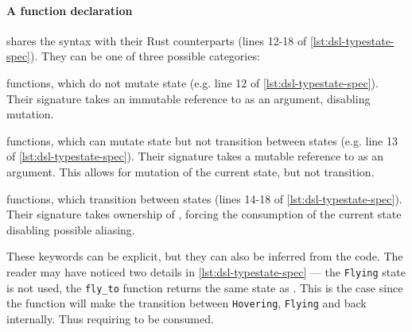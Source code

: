 \paragraph{A function declaration} shares the syntax with their Rust counterparts (lines 12-18 of \autoref{lst:dsl-typestate-spec}).
They can be one of three possible categories:
\begin{compactitem}
    \item {} functions, which do not mutate state (e.g. line 12 of \autoref{lst:dsl-typestate-spec}).
    Their signature takes an immutable reference to  as an argument,
    disabling mutation.
    \item {} functions, which can mutate state but not transition between states (e.g. line 13 of \autoref{lst:dsl-typestate-spec}).
    Their signature takes a mutable reference to  as an argument.
    This allows for mutation of the current state, but not transition.
    \item {} functions, which transition between states (lines 14-18 of \autoref{lst:dsl-typestate-spec}).
    Their signature takes ownership of ,
    forcing the consumption of the current state disabling possible aliasing.
\end{compactitem}
These keywords can be explicit, but they can also be inferred from the code.
The reader may have noticed two details in \autoref{lst:dsl-typestate-spec} ---
the \texttt{Flying} state is not used,
the \texttt{fly\_to} function returns the same state as .
This is the case since the function will make the transition between \texttt{Hovering}, \texttt{Flying} and back internally.
Thus requiring  to be consumed.




